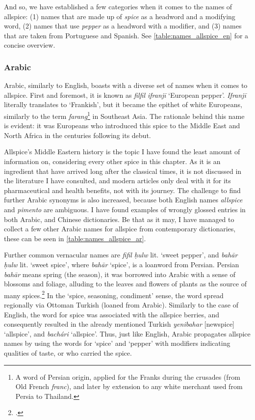 And so, we have established a few categories when it comes to the names of allspice: (1) names that are made up of \textit{spice} as a headword and a modifying word, (2) names that use \textit{pepper} as a headword with a modifier, and (3) names that are taken from Portuguese and Spanish. See \cref{table:names_allspice_en} for a concise overview.



\subsubsection{Arabic}





Arabic, similarly to English, boasts with a diverse set of names when it comes to  allspice. First and foremost, it is known as \textit{filfil ifranjī} `European pepper'. \textit{Ifranjī} literally translates to `Frankish', but it became the epithet of white Europeans, similarly to the term \textit{farang}\footnote{A word of Persian origin, applied for the Franks during the crusades (from Old French \textit{franc}), and later by extension to any white merchant used from Persia to Thailand.} in Southeast Asia. The rationale behind this name is evident: it was Europeans who introduced this spice to the Middle East and North Africa in the centuries following its debut. %

Allspice's Middle Eastern history is the topic I have found the least amount of information on, considering every other spice in this chapter. As it is an ingredient that have arrived long after the classical times, it is not discussed in the literature I have consulted, and modern articles only deal with it for its pharmaceutical and health benefits, not with its journey. The challenge to find further Arabic synonyms is also increased, because both English names \textit{allspice} and \textit{pimento} are ambiguous. I have found examples of wrongly glossed entries in both Arabic, and Chinese dictionaries. Be that as it may, I have managed to collect a few other Arabic names for allspice from contemporary dictionaries, these can be seen in \cref{table:names_allspice_ar}. 

Further common vernacular names are \textit{fifil ḥulw} lit. `sweet pepper', and \textit{bahār ḥulw} lit. `sweet spice', where \textit{bahār} `spice', is a loanword from Persian. Persian  \textit{bahār} means spring (the season), it was borrowed into Arabic with a sense of blossoms and foliage, alluding to the leaves and flowers of plants as the source of many spices.\footcite[121]{dozy_supplement_1881} In the `spice, seasoning, condiment' sense, the word spread regionally via Ottoman Turkish (loaned from Arabic). Similarly to the case of English, the word for spice was associated with the allspice berries, and consequently resulted in the already mentioned Turkish \textit{yenibahar} [newspice] `allspice', and  \textit{bachári} `allspice'. Thus, just like English, Arabic propagates allspice names by using the words for `spice' and `pepper' with modifiers indicating qualities of taste, or who carried the spice.

